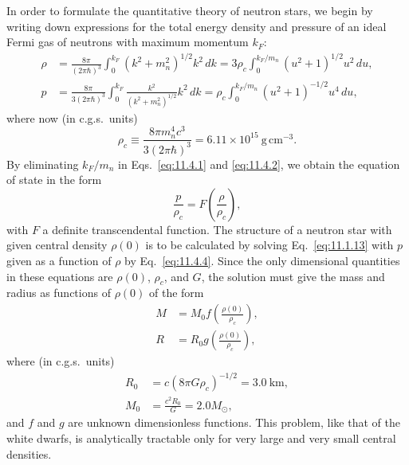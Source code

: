 In order to formulate the quantitative theory of neutron stars, we begin by
writing down expressions for the total energy density and pressure of an ideal
Fermi gas of neutrons with maximum momentum \(k_F\):
\begin{align}
  \rho
  &=
  \frac{8\pi}{(2\pi\hbar)^3}
  \int_0^{k_F}(k^2+m_n^2)^{1/2}k^2\,dk
  =
  3\rho_c\int_0^{k_F/m_n}(u^2+1)^{1/2}u^2\,du,
  \tag{11.4.1}\label{eq:11.4.1}\\
  p
  &=
  \frac{8\pi}{3(2\pi\hbar)^3}
  \int_0^{k_F}\frac{k^2}{(k^2+m_n^2)^{1/2}}k^2\,dk
  =
  \rho_c\int_0^{k_F/m_n}(u^2+1)^{-1/2}u^4\,du,
  \tag{11.4.2}\label{eq:11.4.2}
\end{align}
where now (in c.g.s.\ units)
\begin{equation}
  \rho_c
  \equiv
  \frac{8\pi m_n^4c^3}{3(2\pi\hbar)^3}
  =
  6.11\times10^{15}\ \mathrm{g\,cm^{-3}}.
  \tag{11.4.3}\label{eq:11.4.3}
\end{equation}
By eliminating \(k_F/m_n\) in Eqs.~\eqref{eq:11.4.1} and
\eqref{eq:11.4.2}, we obtain the equation of state in the form
\begin{equation}
  \frac p{\rho_c}
  =
  F\left(\frac{\rho}{\rho_c}\right),
  \tag{11.4.4}\label{eq:11.4.4}
\end{equation}
with \(F\) a definite transcendental function. The structure of a neutron star
with given central density \(\rho(0)\) is to be calculated by solving
Eq.~\eqref{eq:11.1.13} with \(p\) given as a function of \(\rho\) by
Eq.~\eqref{eq:11.4.4}. Since the only dimensional quantities in these
equations are \(\rho(0)\), \(\rho_c\), and \(G\), the solution must give the
mass and radius as functions of \(\rho(0)\) of the form
\begin{align}
  M&=M_0f\left(\frac{\rho(0)}{\rho_c}\right),
  \tag{11.4.5}\label{eq:11.4.5}\\
  R&=R_0g\left(\frac{\rho(0)}{\rho_c}\right),
  \tag{11.4.6}\label{eq:11.4.6}
\end{align}
where (in c.g.s.\ units)
\begin{align}
  R_0&=c(8\pi G\rho_c)^{-1/2}=3.0\ \mathrm{km},
  \tag{11.4.7}\label{eq:11.4.7}\\
  M_0&=\frac{c^2R_0}{G}=2.0M_\odot,
  \tag{11.4.8}\label{eq:11.4.8}
\end{align}
and \(f\) and \(g\) are unknown dimensionless functions. This problem, like
that of the white dwarfs, is analytically tractable only for very large and
very small central densities.

